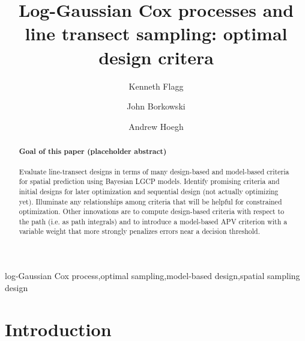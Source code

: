 \documentclass[review]{elsarticle}
\begin{document}
\begin{frontmatter}

\title{Log-Gaussian Cox processes and line transect sampling: optimal design critera}

\author[msuaddr]{Kenneth Flagg}

\author[msuaddr]{John Borkowski}
\author[msuaddr]{Andrew Hoegh}

\address[msuaddr]{Department of Mathematical Sciences, Montana State University, Bozeman, MT 59717}

\begin{abstract}

\paragraph{Goal of this paper (placeholder abstract)} Evaluate line-transect
designs in terms of many design-based and model-based criteria for spatial
prediction using Bayesian LGCP models. Identify promising criteria and initial
designs for later optimization and sequential design (not actually optimizing
yet). Illuminate any relationships among criteria that will be helpful for
constrained optimization. Other innovations are to compute design-based
criteria with respect to the path (i.e. as path integrals) and to introduce a
model-based APV criterion with a variable weight that more strongly penalizes
errors near a decision threshold.

\end{abstract}

\begin{keyword}
log-Gaussian Cox process\sep optimal sampling\sep model-based design\sep spatial sampling design
\end{keyword}

\end{frontmatter}

\linenumbers



\section{Introduction}
\end{document}

